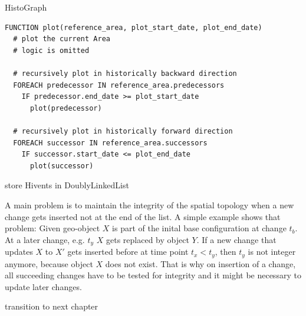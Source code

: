 
HistoGraph
\begin{lstlisting}[language=pseudocode,
  caption=plotting Areas on the HistoGraph,
  label=lst:histograph_plot]
FUNCTION plot(reference_area, plot_start_date, plot_end_date)
  # plot the current Area
  # logic is omitted

  # recursively plot in historically backward direction
  FOREACH predecessor IN reference_area.predecessors
    IF predecessor.end_date >= plot_start_date
      plot(predecessor)

  # recursively plot in historically forward direction
  FOREACH successor IN reference_area.successors
    IF successor.start_date <= plot_end_date
      plot(successor)
\end{lstlisting}

store Hivents in DoublyLinkedList



A main problem is to maintain the integrity of the spatial topology when a new change gets inserted not at the end of the list. A simple example shows that problem: Given geo-object $X$ is part of the inital base configuration at change $t_b$. At a later change, e.g. $t_y$ $X$ gets replaced by object $Y$. If a new change that updates $X$ to $X'$ gets inserted before at time point $t_x < t_y$, then $t_y$ is not integer anymore, because object $X$ does not exist. That is why on insertion of a change, all succeeding changes have to be tested for integrity and it might be necessary to update later changes.






\vspace{2em}
transition to next chapter